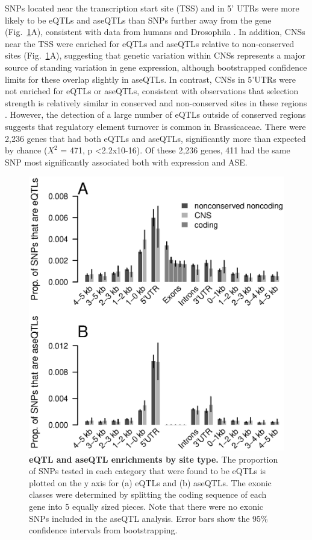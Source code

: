 SNPs located near the transcription start site (TSS) and in 5’ UTRs were more likely to be eQTLs and aseQTLs than SNPs further away from the gene (Fig.~\ref{fig:3fig2}A), consistent with data from humans and Drosophila \citep{Massouras2012-wq,Pickrell2010-ci,Battle2014-ke}. In addition, CNSs near the TSS were enriched for eQTLs and aseQTLs relative to non-conserved sites (Fig.~\ref{fig:3fig2}A), suggesting that genetic variation within CNSs represents a major source of standing variation in gene expression, although bootstrapped confidence limits for these overlap slightly in aseQTLs. In contrast, CNSs in 5’UTRs were not enriched for eQTLs or aseQTLs, consistent with observations that selection strength is relatively similar in conserved and non-conserved sites in these regions \citep{Haudry2013-qe}. However, the detection of a large number of eQTLs outside of conserved regions suggests that regulatory element turnover is common in Brassicaceae. There were 2,236 genes that had both eQTLs and aseQTLs, significantly more than expected by chance ($X^{2}$ = 471, p \textless 2.2x10-16). Of these 2,236 genes, 411 had the same SNP most significantly associated both with expression and ASE.

\begin{figure}[ht!]
      \centering
       \includegraphics[width=\linewidth]{Ch3Fig2}
    \caption{\textbf{eQTL and aseQTL enrichments by site type.} The proportion of SNPs tested in each category that were found to be eQTLs is plotted on the y axis for (a) eQTLs and (b) aseQTLs. The exonic classes were determined by splitting the coding sequence of each gene into 5 equally sized pieces. Note that there were no exonic SNPs included in the aseQTL analysis. Error bars show the 95\% confidence intervals from bootstrapping.}
    \label{fig:3fig2}
\end{figure}

